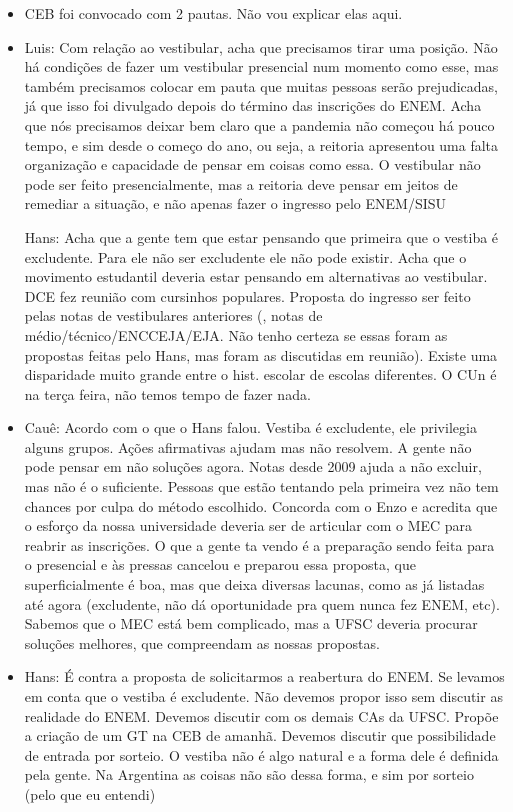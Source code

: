 \documentclass{ata-calico}
\begin{document}
\begin{itemize}
    \item CEB foi convocado com 2 pautas. Não vou explicar elas aqui.
    \item Luis: Com relação ao vestibular, acha que precisamos tirar uma posição. Não há condições de fazer um vestibular presencial num momento como esse, mas também precisamos colocar em pauta que muitas pessoas serão prejudicadas, já que isso foi divulgado depois do término das inscrições do ENEM. Acha que nós precisamos deixar bem claro que a pandemia não começou há pouco tempo, e sim desde o começo do ano, ou seja,  a reitoria apresentou uma falta organização e capacidade de pensar em coisas como essa. O vestibular não pode ser feito presencialmente, mas a reitoria deve pensar em jeitos de remediar a situação, e não apenas fazer o ingresso pelo ENEM/SISU
    
    \tem Hans: Acha que a gente tem que estar pensando que primeira que o vestiba é excludente. Para ele não ser excludente ele não pode existir. Acha que o movimento estudantil deveria estar pensando em alternativas ao vestibular. DCE fez reunião com cursinhos populares. Proposta do ingresso ser feito pelas notas de vestibulares anteriores (, notas de médio/técnico/ENCCEJA/EJA. Não tenho certeza se essas foram as propostas feitas pelo Hans, mas foram as discutidas em reunião). Existe uma disparidade muito grande entre o hist. escolar de escolas diferentes. O CUn é na terça feira, não temos tempo de fazer nada.
    
    \item Cauê: Acordo com o que o Hans falou. Vestiba é excludente, ele privilegia alguns grupos. Ações afirmativas ajudam mas não resolvem. A gente não pode pensar em não soluções agora. Notas desde 2009 ajuda a não excluir, mas não é o suficiente. Pessoas que estão tentando pela primeira vez não tem chances por culpa do método escolhido. Concorda com o Enzo e acredita que o esforço da nossa universidade deveria ser de articular com o MEC para reabrir as inscrições. O que a gente ta vendo é a preparação sendo feita para o presencial e às pressas cancelou e preparou essa proposta, que superficialmente é boa, mas que deixa diversas lacunas, como as já listadas até agora (excludente, não dá oportunidade pra quem nunca fez ENEM, etc). Sabemos que o MEC está bem complicado, mas a UFSC deveria procurar soluções melhores, que compreendam as nossas propostas.
    
    \item Hans: É contra a proposta de solicitarmos a reabertura do ENEM. Se levamos em conta que o vestiba é excludente. Não devemos propor isso sem discutir as realidade do ENEM. Devemos discutir com os demais CAs da UFSC. Propõe a criação de um GT na CEB de amanhã. Devemos discutir que possibilidade de entrada por sorteio. O vestiba não é algo natural e a forma dele é definida pela gente. Na Argentina as coisas não são dessa forma, e sim por sorteio (pelo que eu entendi)
    

\end{itemize}
\end{document}
